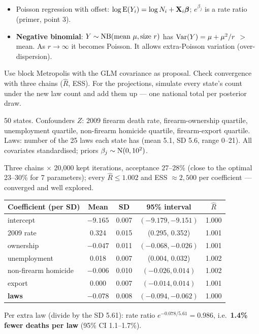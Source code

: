 \documentclass[11pt]{article}
\begin{document}
\begin{recall}
\begin{itemize}
\item Poisson regression with offset: $\log\mathrm{E}(Y_i)=\log N_i+\mathbf X_i\bm\beta$; $e^{\beta_j}$ is a rate ratio (primer, point 3).
\item \textbf{Negative binomial}: $Y\sim\mathrm{NB}(\text{mean }\mu,\text{size }r)$ has $\mathrm{Var}(Y)=\mu+\mu^2/r$ $>$ mean. As $r\to\infty$ it becomes Poisson. It allows extra-Poisson variation (over-dispersion).
\end{itemize}
\end{recall}

\begin{keyidea}
Use block Metropolis with the GLM covariance as proposal. Check convergence with three chains ($\hat R$, ESS). For the projections, simulate every state's count under the new law count and add them up --- one national total per posterior draw.
\end{keyidea}

\solution
{} 50 states. Confounders $Z$: 2009 firearm death rate, firearm-ownership quartile, unemployment quartile, non-firearm homicide quartile, firearm-export quartile. Laws: number of the 25 laws each state has (mean 5.1, SD 5.6, range 0--21). All covariates standardised; priors $\beta_j\sim\mathrm{N}(0,10^2)$.

 Three chains $\times$ 20{,}000 kept iterations, acceptance 27--28\% (close to the optimal 23--30\% for 7 parameters); every $\hat R\le1.002$ and ESS $\approx2{,}500$ per coefficient --- converged and well explored.
\begin{center}
\small
\begin{tabular}{lcccc}\toprule
Coefficient (per SD) & Mean & SD & 95\% interval & $\hat R$\\\midrule
intercept & $-9.165$ & 0.007 & $(-9.179,-9.151)$ & 1.000\\
2009 rate & 0.324 & 0.015 & (0.295, 0.352) & 1.001\\
ownership & $-0.047$ & 0.011 & $(-0.068,-0.026)$ & 1.001\\
unemployment & 0.018 & 0.007 & (0.004, 0.032) & 1.002\\
non-firearm homicide & $-0.006$ & 0.010 & $(-0.026, 0.014)$ & 1.002\\
export & 0.000 & 0.007 & $(-0.014, 0.014)$ & 1.001\\
\textbf{laws} & $\mathbf{-0.078}$ & 0.008 & $(-0.094,-0.062)$ & 1.000\\\bottomrule
\end{tabular}
\end{center}
Per extra law (divide by the SD 5.61): rate ratio $e^{-0.078/5.61}=0.986$, i.e.\ \textbf{1.4\% fewer deaths per law} (95\% CI 1.1--1.7\%).
\end{document}
